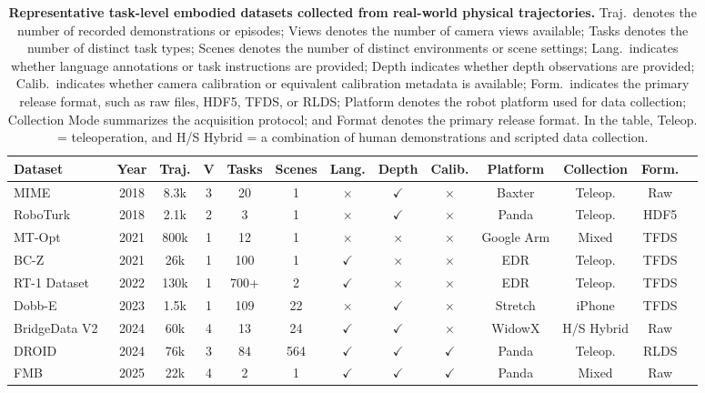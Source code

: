 \documentclass[acmsmall,screen,review]{acmart}
\begin{document}
\begin{table}[t] 
\centering
\caption{\textbf{Representative task-level embodied datasets collected from real-world physical trajectories.} 
Traj.\ denotes the number of recorded demonstrations or episodes; 
Views denotes the number of camera views available; 
Tasks denotes the number of distinct task types; Scenes denotes the number of distinct environments or scene settings; 
Lang.\ indicates whether language annotations or task instructions are provided; 
Depth indicates whether depth observations are provided;
Calib.\ indicates whether camera calibration or equivalent calibration metadata is available; 
Form.\ indicates the primary release format, such as raw files, HDF5, TFDS, or RLDS\@;
Platform denotes the robot platform used for data collection; 
Collection Mode summarizes the acquisition protocol; and Format denotes the primary release format. 
In the table, Teleop. = teleoperation, and H/S Hybrid = a combination of human demonstrations and scripted data collection.}\label{tab:task_datasets}
\scriptsize
\begin{tabular}{
  l
  c
  c
  c
  c
  c
  c
  c
  c
  c
  c
  c
  c}
\toprule
\textbf{Dataset} & \textbf{Year} & \textbf{Traj.} & \textbf{V} & \textbf{Tasks} & \textbf{Scenes} & \textbf{Lang.} & \textbf{Depth} & \textbf{Calib.} & \textbf{Platform} & \textbf{Collection} & \textbf{Form.} \\
\midrule
MIME~\cite{sharma2018mime} & 2018 & 8.3k & 3 & 20 & 1 & $\times$ & $\checkmark$ & $\times$ & Baxter & Teleop. & Raw \\
RoboTurk~\cite{mandlekar2018roboturk} & 2018 & 2.1k & 2 & 3 & 1 & $\times$ & $\checkmark$ & $\times$ & Panda & Teleop. & HDF5 \\
MT-Opt~\cite{kalashnikov2021mt} & 2021 & 800k & 1 & 12 & 1 & $\times$ & $\times$ & $\times$ & Google Arm & Mixed & TFDS \\
BC-Z~\cite{jang2022bc} & 2021 & 26k & 1 & 100 & 1 & $\checkmark$ & $\times$ & $\times$ & EDR & Teleop. & TFDS \\
RT-1 Dataset~\cite{brohan2023rt1} & 2022 & 130k & 1 & 700+ & 2 & $\checkmark$ & $\times$ & $\times$ & EDR & Teleop. & TFDS \\
Dobb-E~\cite{shafiullah2023bringing} & 2023 & 1.5k & 1 & 109 & 22 & $\times$ & $\checkmark$ & $\times$ & Stretch & iPhone & TFDS \\
BridgeData V2~\cite{walke2024bridgedatav2} & 2024 & 60k & 4 & 13 & 24 & $\checkmark$ & $\checkmark$ & $\times$ & WidowX & H/S Hybrid & Raw \\
DROID~\cite{khazatsky2024droid} & 2024 & 76k & 3 & 84 & 564 & $\checkmark$ & $\checkmark$ & $\checkmark$ & Panda & Teleop. & RLDS \\
FMB~\cite{fu2025fmb} & 2025 & 22k & 4 & 2 & 1 & $\checkmark$ & $\checkmark$ & $\checkmark$ & Panda & Mixed & Raw \\
\bottomrule
\end{tabular}
\end{table}
\end{document}
